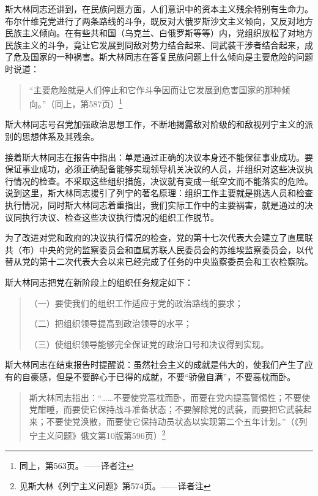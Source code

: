 斯大林同志还讲到，在民族问题方面，人们意识中的资本主义残余特别有生命力。布尔什维克党进行了两条路线的斗争，既反对大俄罗斯沙文主义倾向，又反对地方民族主义倾向。在有些共和国（乌克兰、白俄罗斯等等）内，党组织放松了对地方民族主义的斗争，竟让它发展到同敌对势力结合起来、同武装干涉者结合起来，成了危及国家的一种祸害。斯大林同志在答复民族问题上什么倾向是主要危险的问题时说道：

\begin{quotation}
“主要危险就是人们停止和它作斗争因而让它发展到危害国家的那种倾向。”（同上，第587页）\footnote{同上，第563页。——译者注}
\end{quotation}

斯大林同志号召党加强政治思想工作，不断地揭露敌对阶级的和敌视列宁主义的派别的思想体系及其残余。

接着斯大林同志在报告中指出：单是通过正确的决议本身还不能保征事业成功。要保证事业成功，必须正确配备能够实现领导机关决议的人员，并组织对这些决议执行情况的检查。不采取这些组织措施，决议就有变成一纸空文而不能落实的危险。说到这里，斯大林同志援引了列宁的著名原理：组织工作主要就是挑选人员和检查执行情况，同时斯大林同志着重指出，我们实际工作中的主要祸害，就是通过的决议同执行决议、检查这些决议执行情况的组织工作脱节。

为了改进对党和政府的决议执行情况的检查，党的第十七次代表大会建立了直属联共（布）中央的党的监察委员会和直属苏联人民委员会的苏维埃监察委员会，以代替从党的第十二次代表大会以来已经完成了任务的中央监察委员会和工农检察院。

斯大林同志把党在新阶段上的组织任务规定如下：

\begin{quotation}
（一）要使我们的组织工作适应于党的政治路线的要求；

（二）把组织领导提高到政治领导的水平；

（三）使组织领导能够完全保证党的政治口号和决议得到实现。
\end{quotation}

斯大林同志在结束报告时提醒说：虽然社会主义的成就是伟大的，使我们产生了应有的自豪感，但是不要醉心于已得的成就，不要“骄傲自满”，不要高枕而卧。

\begin{quotation}
斯大林同志指出：“……不要使党高枕而卧，而要在党内提高警惕性；不要使党酣睡，而要使它保持战斗准备状态；不要解除党的武装，而要把它武装起来；不要使党涣散，而要使它保持动员状态以实现第二个五年计划。”（《列宁主义问题》俄文第10版第596页）\footnote{见斯大林《列宁主义问题》第574页。——译者注}
\end{quotation}

